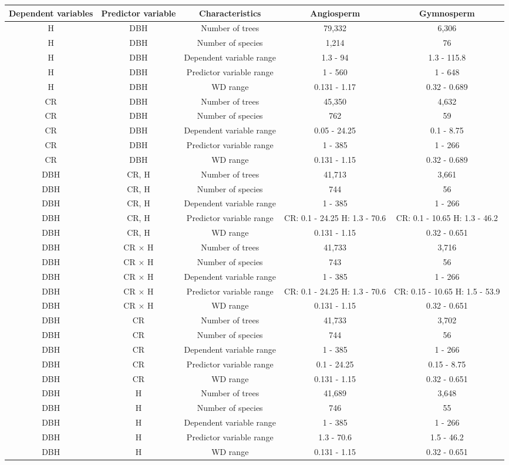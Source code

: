 \documentclass[
  12pt,
  letterpaper,
  DIV=11,
  numbers=noendperiod]{scrartcl}
\begin{document}
\begingroup\fontsize{10}{12}\selectfont

\begin{longtable*}[t]{ccccc}
\toprule
Dependent variables & Predictor variable & Characteristics & Angiosperm & Gymnosperm\\
\midrule
H & DBH & Number of trees & 79,332 & 6,306\\
H & DBH & Number of species & 1,214 & 76\\
H & DBH & Dependent variable range & 1.3 - 94 & 1.3 - 115.8\\
H & DBH & Predictor variable range & 1 - 560 & 1 - 648\\
H & DBH & WD range & 0.131 - 1.17 & 0.32 - 0.689\\
\addlinespace
CR & DBH & Number of trees & 45,350 & 4,632\\
CR & DBH & Number of species & 762 & 59\\
CR & DBH & Dependent variable range & 0.05 - 24.25 & 0.1 - 8.75\\
CR & DBH & Predictor variable range & 1 - 385 & 1 - 266\\
CR & DBH & WD range & 0.131 - 1.15 & 0.32 - 0.689\\
\addlinespace
DBH & CR, H & Number of trees & 41,713 & 3,661\\
DBH & CR, H & Number of species & 744 & 56\\
DBH & CR, H & Dependent variable range & 1 - 385 & 1 - 266\\
DBH & CR, H & Predictor variable range & CR: 0.1 - 24.25 H: 1.3 - 70.6 & CR: 0.1 - 10.65 H: 1.3 - 46.2\\
DBH & CR, H & WD range & 0.131 - 1.15 & 0.32 - 0.651\\
\addlinespace
DBH & CR × H & Number of trees & 41,733 & 3,716\\
DBH & CR × H & Number of species & 743 & 56\\
DBH & CR × H & Dependent variable range & 1 - 385 & 1 - 266\\
DBH & CR × H & Predictor variable range & CR: 0.1 - 24.25 H: 1.3 - 70.6 & CR: 0.15 - 10.65 H: 1.5 - 53.9\\
DBH & CR × H & WD range & 0.131 - 1.15 & 0.32 - 0.651\\
\addlinespace
DBH & CR & Number of trees & 41,733 & 3,702\\
DBH & CR & Number of species & 744 & 56\\
DBH & CR & Dependent variable range & 1 - 385 & 1 - 266\\
DBH & CR & Predictor variable range & 0.1 - 24.25 & 0.15 - 8.75\\
DBH & CR & WD range & 0.131 - 1.15 & 0.32 - 0.651\\
\addlinespace
DBH & H & Number of trees & 41,689 & 3,648\\
DBH & H & Number of species & 746 & 55\\
DBH & H & Dependent variable range & 1 - 385 & 1 - 266\\
DBH & H & Predictor variable range & 1.3 - 70.6 & 1.5 - 46.2\\
DBH & H & WD range & 0.131 - 1.15 & 0.32 - 0.651\\
\bottomrule
\end{longtable*}
\endgroup{}
\end{document}

